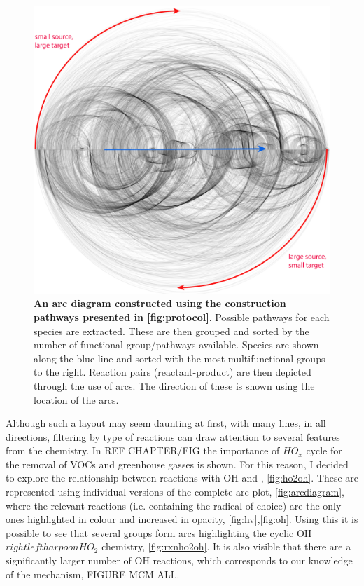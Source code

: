 \begin{figure}[H]
     \centering
     \includegraphics[width=.8\textwidth]{figures_c1/arc/arc_all.png}
     \caption{\textbf{An arc diagram constructed using the construction pathways presented in \autoref{fig:protocol}}. Possible pathways for each species are extracted. These are then grouped and sorted by the number of functional group/pathways available. Species are shown along the blue line and sorted with the most multifunctional groups to the right. Reaction pairs (reactant-product) are then depicted through the use of arcs. The direction of these is shown using the location of the arcs. }
     \label{fig:arcdiagram}
\end{figure}

Although such a layout may seem daunting at first, with many lines, in all directions, filtering by type of reactions can draw attention to several features from the chemistry. In REF CHAPTER/FIG the importance of $HO_x$ cycle for the removal of VOCs and greenhouse gasses is shown. For this reason, I decided to explore the relationship between reactions with OH and , \autoref{fig:ho2oh}. These are represented using individual versions of the complete arc plot, \autoref{fig:arcdiagram}, where the relevant reactions (i.e. containing the radical of choice) are the only ones highlighted in colour and increased in opacity, \autoref{fig:hv},\autoref{fig:oh}.
Using this it is possible to see that several groups form arcs highlighting the cyclic OH $  rightleftharpoon HO_2 $ chemistry,
\autoref{fig:rxnho2oh}. It is also visible that there are a significantly larger number of OH reactions, which corresponds to our knowledge of the mechanism, FIGURE MCM ALL.

